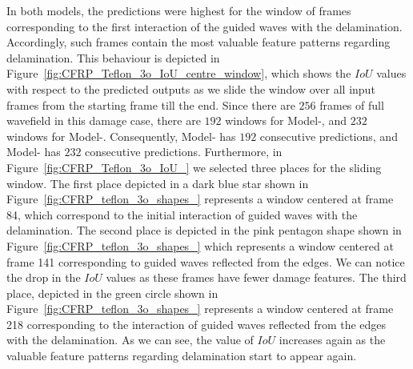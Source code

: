 In both models, the predictions were highest for the window of frames corresponding to the first interaction of the guided waves with the delamination.
Accordingly, such frames contain the most valuable feature patterns regarding delamination. 
This behaviour is depicted in 
Figure~\ref{fig:CFRP_Teflon_3o_IoU_centre_window}, which shows the \(IoU\) 
values with respect to the predicted outputs as we slide the window over all 
input frames from the starting frame till the end.
Since there are \(256\) frames of full wavefield in this damage case, there are \(192\) windows for Model-, and \(232\) windows for Model-.
Consequently, Model- has \(192\) consecutive predictions, and Model- has \(232\) consecutive predictions.
Furthermore, in Figure~\ref{fig:CFRP_Teflon_3o_IoU_} we selected three places 
for the sliding window. 
The first place depicted in a dark blue star shown in 
Figure~\ref{fig:CFRP_teflon_3o_shapes_} represents a window centered at frame 
84, which correspond to the initial interaction of guided waves with the 
delamination.
The second place is depicted in the pink pentagon shape shown in 
Figure~\ref{fig:CFRP_teflon_3o_shapes_} which represents a window centered at 
frame 141 corresponding to guided waves reflected from the edges.
We can notice the drop in the \(IoU\) values as these frames have fewer damage features.
The third place, depicted in the green circle shown in 
Figure~\ref{fig:CFRP_teflon_3o_shapes_} represents a window centered at frame 
218 corresponding to the interaction of guided waves reflected from the edges 
with the delamination.
As we can see, the value of \(IoU\) increases again as the valuable feature patterns regarding delamination start to appear again.

